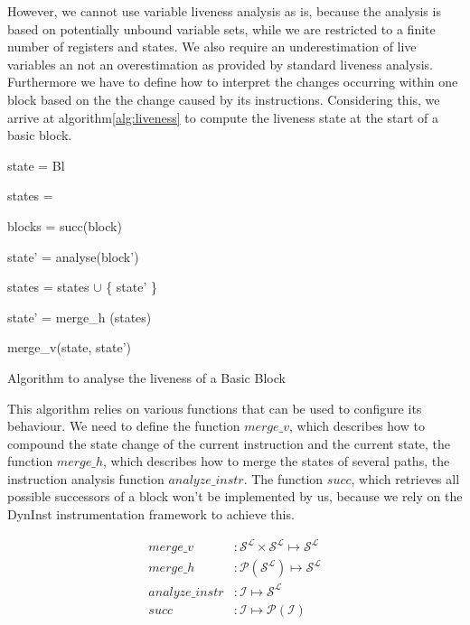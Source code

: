 However, we cannot use variable liveness analysis as is, because the analysis is based on potentially unbound variable sets, while we are restricted to a finite number of registers and states. We also require an underestimation of live variables an not an overestimation as provided by standard liveness analysis. Furthermore we have to define how to interpret the changes occurring within one block based on the the change caused by its instructions. Considering this, we arrive at algorithm\ref{alg:liveness} to compute the liveness state at the start of a basic block.

{\centering\begin{algorithm}[!h]
	\SetAlgoLined
	{
 	state = Bl
 	

	states = {}
	
	blocks = succ(block)
	
	 {
	
 		state' = analyse(block')
 		
		states = states $\cup$ \{ state' \}
	}

	state' = merge\_h (states)

	\Return merge\_v(state, state')

	}
\caption{Algorithm to analyse the liveness of a Basic Block}
\label{alg:liveness}
\end{algorithm}
}

This algorithm relies on various functions that can be used to configure its behaviour. We need to define the function $merge\_v$, which describes how to compound the state change of the current instruction and the current state, the function $merge\_h$, which describes how to merge the states of several paths, the instruction analysis function $analyze\_instr$. The function $succ$, which retrieves all possible successors of a block won't be implemented by us, because we rely on the DynInst instrumentation framework to achieve this.

\begin{subequations}
\label{eq:livenesscustom}
\begin{align}
merge\_v &: \mathcal{S}^\mathcal{L} \times \mathcal{S}^\mathcal{L} \mapsto \mathcal{S}^\mathcal{L}\\
merge\_h &: \mathcal{P}(\mathcal{S}^\mathcal{L}) \mapsto \mathcal{S}^\mathcal{L}\\
analyze\_instr &: \mathcal {I} \mapsto \mathcal{S}^\mathcal{L} \\
succ &: \mathcal{I} \mapsto \mathcal{P}(\mathcal{I})
\end{align}
\end{subequations}

